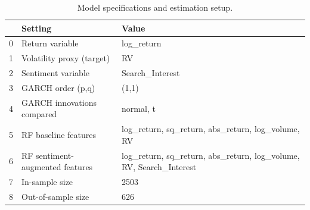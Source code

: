 \begin{table}[htbp]
\centering
\begin{tabular}{lll}
\toprule
 & Setting & Value \\
\midrule
0 & Return variable & log_return \\
1 & Volatility proxy (target) & RV \\
2 & Sentiment variable & Search_Interest \\
3 & GARCH order (p,q) & (1,1) \\
4 & GARCH innovations compared & normal, t \\
5 & RF baseline features & log_return, sq_return, abs_return, log_volume, RV \\
6 & RF sentiment-augmented features & log_return, sq_return, abs_return, log_volume, RV, Search_Interest \\
7 & In-sample size & 2503 \\
8 & Out-of-sample size & 626 \\
\bottomrule
\end{tabular}
\caption{Model specifications and estimation setup.}
\label{tab:model_spec}
\end{table}
